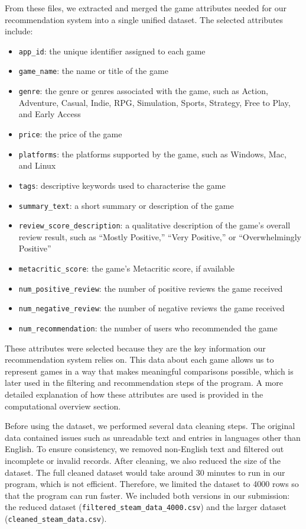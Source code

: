 \documentclass[fontsize=11pt]{article}
\begin{document}
From these files, we extracted and merged the game attributes needed for our recommendation system into a single unified dataset. The selected attributes include:
\begin{itemize}
    \item \texttt{app\_id}: the unique identifier assigned to each game
    \item \texttt{game\_name}: the name or title of the game
    \item \texttt{genre}: the genre or genres associated with the game, such as Action, Adventure, Casual, Indie, RPG, Simulation, Sports, Strategy, Free to Play, and Early Access
    \item \texttt{price}: the price of the game
    \item \texttt{platforms}: the platforms supported by the game, such as Windows, Mac, and Linux
    \item \texttt{tags}: descriptive keywords used to characterise the game
    \item \texttt{summary\_text}: a short summary or description of the game
    \item \texttt{review\_score\_description}: a qualitative description of the game’s overall review result, such as ``Mostly Positive,'' ``Very Positive,'' or ``Overwhelmingly Positive''
    \item \texttt{metacritic\_score}: the game’s Metacritic score, if available
    \item \texttt{num\_positive\_review}: the number of positive reviews the game received
    \item \texttt{num\_negative\_review}: the number of negative reviews the game received
    \item \texttt{num\_recommendation}: the number of users who recommended the game
\end{itemize}

These attributes were selected because they are the key information our recommendation system relies on. This data about each game allows us to represent games in a way that makes meaningful comparisons possible, which is later used in the filtering and recommendation steps of the program. A more detailed explanation of how these attributes are used is provided in the computational overview section.

Before using the dataset, we performed several data cleaning steps. The original data contained issues such as unreadable text and entries in languages other than English. To ensure consistency, we removed non-English text and filtered out incomplete or invalid records. After cleaning, we also reduced the size of the dataset. The full cleaned dataset would take around 30 minutes to run in our program, which is not efficient. Therefore, we limited the dataset to 4000 rows so that the program can run faster. We included both versions in our submission: the reduced dataset (\texttt{filtered\_steam\_data\_4000.csv}) and the larger dataset (\texttt{cleaned\_steam\_data.csv}).
\end{document}
